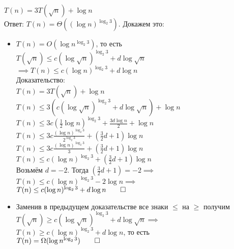\documentclass[12pt]{article}
\newcommand{\logn}{\log n}
\newcommand{\sqrtn}{\sqrt n}
\newcommand{\logsn}{\log\sqrtn}
\newcommand{\e}{\log_2 3}
\begin{document}
	\LARGE
	\noindent
	$T(n) = 3T(\sqrtn) + \logn$\\
	Ответ: $T(n) = \Theta((\logn)^{\e})$. Докажем это:
	\begin{itemize}
		\item
			$T(n) = O(\logn^{\e})$, то есть\\
			$T(\sqrtn) \le c(\log\sqrtn)^{\e} + d\logsn$\\
			$\implies T(n) \le c(\logn)^{\e} + d\logn$\\
			Доказательство:\\
			$T(n) = 3T(\sqrtn) + \logn$\\
			$T(n) \le 3(c(\log\sqrtn)^{\e} + d\logsn) + \logn$\\
			$T(n) \le 3c(\frac{1}{2}\logn)^{\e} + \frac{3d\logn}{2} + \logn$\\
			$T(n) \le 3c\frac{(\logn)^{\e}}{2^{\e}} + (\frac{3}{2}d + 1)\logn$\\
			$T(n) \le 3c\frac{(\logn)^{\e}}{3} + (\frac{3}{2}d + 1)\logn$\\
			$T(n) \le c(\logn)^{\e} + (\frac{3}{2}d + 1)\logn$\\
			Возьмём $d = -2$. Тогда $(\frac{3}{2}d + 1) = -2 \implies$\\
			$T(n) \le c(\logn)^{\e} - 2\logn \implies$\\
			$T(n) \le c(\logn)^{\e} + d\logn \qed$
		\item
			Заменив в предыдущем доказательстве все знаки $\le$ на $\ge$ получим\\
			$T(\sqrtn) \ge c(\log\sqrtn)^{\e} + d\logsn \implies$\\
			$T(n) \ge c(\logn)^{\e} + d\logn$, то есть\\
			$T(n) = \Omega(\logn^{\e}) \qed$
	\end{itemize}
\end{document}
